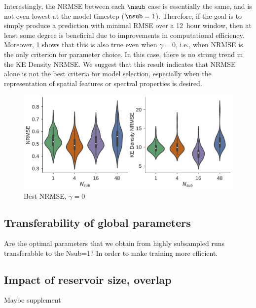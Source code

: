 Interestingly, the NRMSE between each $\nsub$ case is essentially the same, and
is not even lowest at the model timestep ($\nsub=1$).
Therefore, if the goal is to simply produce a prediction with minimal RMSE over a
12~hour window, then at least some degree is beneficial due to improvements in
computational efficiency.
Moreover, \cref{fig:esn-best-nrmse-vs-nsub} shows that this is also true
even when $\gamma=0$, i.e., when NRMSE is the only criterion for parameter
choice.
In this case, there is no strong trend in the KE Density NRMSE.
We suggest that this result indicates that NRMSE alone is not the best criteria
for model selection, especially when the representation of spatial features or
spectral properties is desired.

\begin{figure}
    \centering
    \includegraphics[width=.8\textwidth]{../figures/rc_nrmse_kenrmse_gamma0.0.pdf}
    \caption{Best NRMSE, $\gamma=0$}
    \label{fig:esn-best-nrmse-vs-nsub}
\end{figure}


\subsection{Transferability of global parameters}

Are the optimal parameters that we obtain from highly subsampled runs
transferabble to the Nsub=1?
In order to make training more efficient.

\subsection{Impact of reservoir size, overlap}

Maybe supplement

